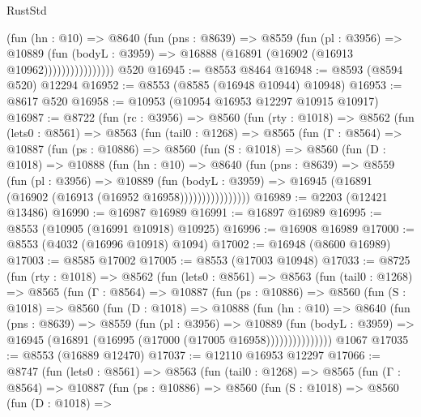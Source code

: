 \begin{lexlean}{RustStd}
\begin{coremodule}
                      (fun (hn : @10) =>
                      @8640
                        (fun (pns : @8639) =>
                        @8559
                          (fun (pl : @3956) =>
                          @10889
                            (fun (bodyL : @3959) =>
                            @16888 (@16891 (@16902 (@16913 @10962))))))))))))))))
    @520
@16945 := @8553 @8464
@16948 := @8593 (@8594 @520) @12294
@16952 := @8553 (@8585 (@16948 @10944) @10948)
@16953 := @8617 @520
@16958 := @10953 (@10954 @16953 @12297 @10915 @10917)
@16987 := @8722
    (fun (rc : @3956) =>
    @8560
      (fun (rty : @1018) =>
      @8562
        (fun (lets0 : @8561) =>
        @8563
          (fun (tail0 : @1268) =>
          @8565
            (fun (Γ : @8564) =>
            @10887
              (fun (ps : @10886) =>
              @8560
                (fun (S : @1018) =>
                @8560
                  (fun (D : @1018) =>
                  @10888
                    (fun (hn : @10) =>
                    @8640
                      (fun (pns : @8639) =>
                      @8559
                        (fun (pl : @3956) =>
                        @10889
                          (fun (bodyL : @3959) =>
                          @16945 (@16891 (@16902 (@16913 (@16952 @16958))))))))))))))))
@16989 := @2203 (@12421 @13486)
@16990 := @16987 @16989
@16991 := @16897 @16989
@16995 := @8553 (@10905 (@16991 @10918) @10925)
@16996 := @16908 @16989
@17000 := @8553 (@4032 (@16996 @10918) @1094)
@17002 := @16948 (@8600 @16989)
@17003 := @8585 @17002
@17005 := @8553 (@17003 @10948)
@17033 := @8725
    (fun (rty : @1018) =>
    @8562
      (fun (lets0 : @8561) =>
      @8563
        (fun (tail0 : @1268) =>
        @8565
          (fun (Γ : @8564) =>
          @10887
            (fun (ps : @10886) =>
            @8560
              (fun (S : @1018) =>
              @8560
                (fun (D : @1018) =>
                @10888
                  (fun (hn : @10) =>
                  @8640
                    (fun (pns : @8639) =>
                    @8559
                      (fun (pl : @3956) =>
                      @10889
                        (fun (bodyL : @3959) =>
                        @16945 (@16891 (@16995 (@17000 (@17005 @16958)))))))))))))))
    @1067
@17035 := @8553 (@16889 @12470)
@17037 := @12110 @16953 @12297
@17066 := @8747
    (fun (lets0 : @8561) =>
    @8563
      (fun (tail0 : @1268) =>
      @8565
        (fun (Γ : @8564) =>
        @10887
          (fun (ps : @10886) =>
          @8560
            (fun (S : @1018) =>
            @8560
              (fun (D : @1018) =>

\end{coremodule}
\end{lexlean}

